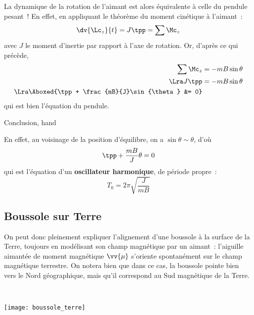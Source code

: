 \documentclass[../main/main.tex]{subfiles}
\begin{document}
La dynamique de la rotation de l'aimant est alors équivalente à celle du pendule
pesant~! En effet, en appliquant le théorème du moment cinétique à l'aimant~:
\[
  \dv{\Lc_z}{t} = J\tpp = \sum \Mc_z
\]
avec $J$ le moment d'inertie par rapport à l'axe de rotation. Or,
d'après ce qui précède,
\begin{align*}
  \sum \Mc_z &= -mB\sin{\theta}
  \\\Lra
  J\tpp &= -mB\sin{\theta}
  \\\Lra 
  \Aboxed{\tpp + \frac{mB}{J}\sin{\theta} &= 0}
\end{align*}
qui est bien l'équation du pendule.
\begin{tror}{Conclusion, hand}
\end{tror}
En effet, au voisinage de
la position d'équilibre, on a $\sin{\theta} \sim \theta$, d'où
\[
  \tpp + \frac{mB}{J}\theta = 0
\]
qui est l'équation d'un \textbf{oscillateur harmonique}, de période propre~:
\[
  T_0 = 2\pi \sqrt{\frac{J}{mB}}
\]

\subsection{Boussole sur Terre}
\label{ssec:boussoleterre}

\begin{minipage}[t]{.5\linewidth}
  On peut donc pleinement expliquer l'alignement d'une boussole à la surface de la
  Terre, toujours en modélisant son champ magnétique par un aimant~: l'aiguille
  aimantée de moment magnétique $\vv{\mu}$ s'oriente spontanément sur le champ
  magnétique terrestre.
  \bigbreak
  On notera bien que dans ce cas, la boussole pointe bien
  vers le Nord géographique, mais qu'il correspond au Sud magnétique de la Terre.
\end{minipage}
\hfill
\begin{minipage}[t]{.5\linewidth}
  ~
  \vspace*{-40pt}
  \begin{center}
    \texttt{[image: boussole\_terre]}
    \label{fig:bterre}
  \end{center}
\end{minipage}
\end{document}
